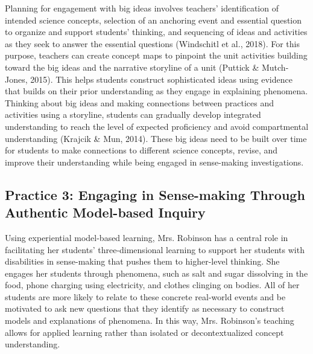 \documentclass[11.5pt]{sig-alternate}
\begin{document}
\begin{large}
Planning for engagement with big ideas involves teachers’ identification of intended science concepts, selection of an anchoring event and essential question to organize and support students’ thinking, and sequencing of ideas and activities as they seek to answer the essential questions (Windschitl et al., 2018). For this purpose, teachers can create concept maps to pinpoint the unit activities building toward the big ideas and the narrative storyline of a unit (Puttick \& Mutch-Jones, 2015). This helps students construct sophisticated ideas using evidence that builds on their prior understanding as they engage in explaining phenomena. Thinking about big ideas and making connections between practices and activities using a storyline, students can gradually develop integrated understanding to reach the level of expected proficiency and avoid compartmental understanding (Krajcik \& Mun, 2014). These big ideas need to be built over time for students to make connections to different science concepts, revise, and improve their understanding while being engaged in sense-making investigations.


\subsection*{Practice 3: Engaging in Sense-making Through Authentic Model-based Inquiry}

Using experiential model-based learning, Mrs. Robinson has a central role in facilitating her students’ three‐dimensional learning to support her students with disabilities in sense-making that pushes them to higher-level thinking. She engages her students through phenomena, such as salt and sugar dissolving in the food, phone charging using electricity, and clothes clinging on bodies. All of her students are more likely to relate to these concrete real-world events and be motivated to ask new questions that they identify as necessary to construct models and explanations of phenomena. In this way, Mrs. Robinson’s teaching allows for applied learning rather than isolated or decontextualized concept understanding.


\end{large}
\end{document}
